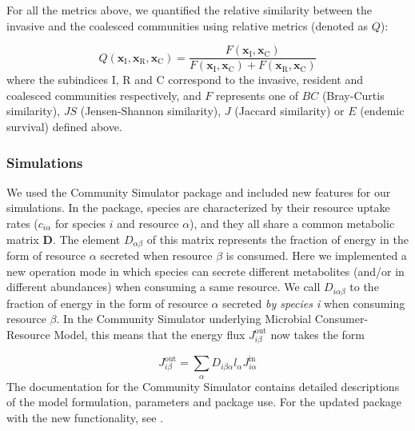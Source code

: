 \documentclass[a4paper,10pt]{article}
\begin{document}
For all the metrics above, we quantified the relative similarity between the invasive
and the coalesced communities using relative metrics (denoted as $Q$):

\begin{equation}
Q \left( \mathbf{x}_\mathrm{I},
\mathbf{x}_\mathrm{R},
\mathbf{x}_\mathrm{C} \right) = 
\frac{F \left( \mathbf{x}_\mathrm{I},\mathbf{x}_\mathrm{C}\right)}
{F \left( \mathbf{x}_\mathrm{I},\mathbf{x}_\mathrm{C}\right)
+
F \left( \mathbf{x}_\mathrm{R},\mathbf{x}_\mathrm{C}\right)}
\label{eq:q}
\end{equation}
%
where the subindices I, R and C correspond to the invasive, resident and coalesced
communities respectively, and $F$ represents one of $BC$ (Bray-Curtis similarity), $JS$
(Jensen-Shannon similarity), $J$ (Jaccard similarity) or $E$ (endemic survival) defined above.

\subsubsection*{Simulations}\label{methods:sim}

We used the Community Simulator package \cite{Marsland2020} and included new
features for our simulations. In the package,
species are characterized by their resource uptake rates ($c_{i\alpha}$ for
species $i$ and resource $\alpha$), and they all
share a common metabolic matrix $\mathbf{D}$.
The element $D_{\alpha\beta}$
of this matrix represents the fraction of energy in the form of resource $\alpha$
secreted when resource $\beta$ is consumed.
Here we implemented a new operation mode
in which species can secrete different metabolites (and/or
in different abundances) when consuming a same resource.
We call $D_{i\alpha\beta}$ to the
fraction of energy in the form of resource $\alpha$ secreted \textit{by species
i} when consuming resource $\beta$.
In the Community Simulator underlying Microbial Consumer-Resource Model,
this means that the energy flux 
$J^{\mathrm{out}}_{i\beta}$ \cite{Goldford2018,Marsland2019}
now takes the form

\begin{equation}
J^{\mathrm{out}}_{i\beta} = \sum_\alpha D_{i\beta\alpha} l_\alpha J^{\mathrm{in}}_{i\alpha}
\label{eq:jout}
\end{equation}
%
The documentation for the Community Simulator contains detailed
descriptions of the model formulation,
parameters and package use.
For the updated package with
the new functionality, see .
\end{document}
